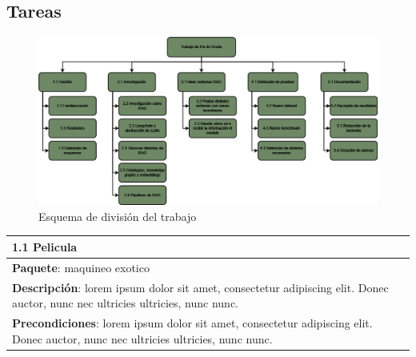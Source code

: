 \subsection{Tareas}
\begin{figure}[!h]
    \centering
    \includegraphics[width=1\textwidth]{images/tfg_edt.png}
    \caption{Esquema de división del trabajo}
    \label{fig:edt}
\end{figure}

\begin{center}
\begin{tabular}{| p{\linewidth} |}
    \hline
    \textbf{1.1 Pelicula} \\
    \hline
    \textbf{Paquete}: maquineo exotico \\
    \hline
    \textbf{Descripción}: lorem ipsum dolor sit amet, consectetur adipiscing elit. Donec auctor, nunc nec ultricies ultricies, nunc nunc. \\
    \hline
    \textbf{Precondiciones}: lorem ipsum dolor sit amet, consectetur adipiscing elit. Donec auctor, nunc nec ultricies ultricies, nunc nunc. \\
    \hline
\end{tabular}
\end{center}
